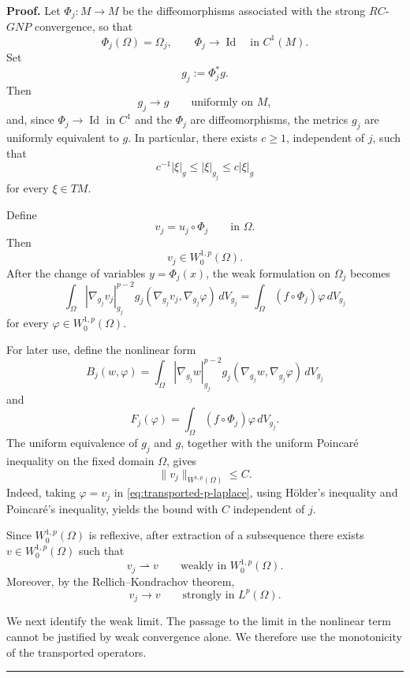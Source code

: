 \documentclass[10pt,a4paper]{amsart}
\newenvironment{proof}[1][Proof]{\textbf{#1.} }{\hfill\rule{0.5em}{0.5em}}
\begin{document}
\begin{proof}
Let $\Phi_j:M\to M$ be the diffeomorphisms associated with the strong
$RC$-$GNP$ convergence, so that
\[
\Phi_j(\Omega)=\Omega_j,
\qquad
\Phi_j\to\operatorname{Id}
\quad\text{in }C^1(M).
\]
Set
\[
g_j:=\Phi_j^*g.
\]
Then
\[
g_j\to g\qquad\text{uniformly on }M,
\]
and, since $\Phi_j\to\operatorname{Id}$ in $C^1$ and the $\Phi_j$ are
diffeomorphisms, the metrics $g_j$ are uniformly equivalent to $g$.
In particular, there exists $c\geq1$, independent of $j$, such that
\[
c^{-1}|\xi|_g\leq |\xi|_{g_j}\leq c|\xi|_g
\]
for every $\xi\in TM$.

Define
\[
v_j=u_j\circ\Phi_j\qquad\text{in }\Omega.
\]
Then
\[
v_j\in W_0^{1,p}(\Omega).
\]
After the change of variables $y=\Phi_j(x)$, the weak formulation on
$\Omega_j$ becomes
\begin{equation}
\int_\Omega
|\nabla_{g_j}v_j|_{g_j}^{p-2}
g_j(\nabla_{g_j}v_j,\nabla_{g_j}\varphi)
\,dV_{g_j}
=
\int_\Omega (f\circ\Phi_j)\varphi\,dV_{g_j}
\label{eq:transported-p-laplace}
\end{equation}
for every $\varphi\in W_0^{1,p}(\Omega)$.

For later use, define the nonlinear form
\[
B_j(w,\varphi)
=
\int_\Omega
|\nabla_{g_j}w|_{g_j}^{p-2}
g_j(\nabla_{g_j}w,\nabla_{g_j}\varphi)
\,dV_{g_j}
\]
and
\[
F_j(\varphi)
=
\int_\Omega(f\circ\Phi_j)\varphi\,dV_{g_j}.
\]
The uniform equivalence of $g_j$ and $g$, together with the uniform
Poincar\'e inequality on the fixed domain $\Omega$, gives
\[
\|v_j\|_{W^{1,p}(\Omega)}\leq C.
\]
Indeed, taking $\varphi=v_j$ in \eqref{eq:transported-p-laplace},
using H\"older's inequality and Poincar\'e's inequality, yields the
bound with $C$ independent of $j$.

Since $W_0^{1,p}(\Omega)$ is reflexive, after extraction of a
subsequence there exists $v\in W_0^{1,p}(\Omega)$ such that
\[
v_j\rightharpoonup v
\qquad\text{weakly in }W_0^{1,p}(\Omega).
\]
Moreover, by the Rellich--Kondrachov theorem,
\[
v_j\longrightarrow v
\qquad\text{strongly in }L^p(\Omega).
\]

We next identify the weak limit. The passage to the limit in the nonlinear term cannot be justified by weak convergence alone. We therefore use the monotonicity of the transported operators.


\end{proof}
\end{document}
